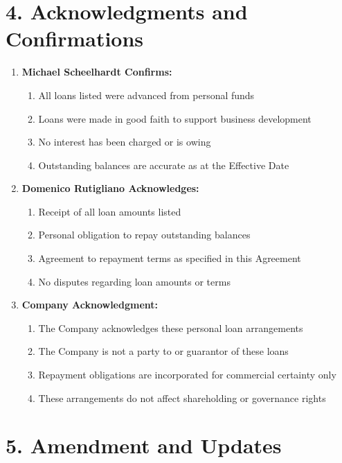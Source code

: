\section*{4. Acknowledgments and Confirmations}

\begin{enumerate}[label=\arabic*.]
\item \textbf{Michael Scheelhardt Confirms:}
    \begin{enumerate}[label=(\alph*)]
    \item All loans listed were advanced from personal funds
    \item Loans were made in good faith to support business development
    \item No interest has been charged or is owing
    \item Outstanding balances are accurate as at the Effective Date
    \end{enumerate}

\item \textbf{Domenico Rutigliano Acknowledges:}
    \begin{enumerate}[label=(\alph*)]
    \item Receipt of all loan amounts listed
    \item Personal obligation to repay outstanding balances
    \item Agreement to repayment terms as specified in this Agreement
    \item No disputes regarding loan amounts or terms
    \end{enumerate}

\item \textbf{Company Acknowledgment:}
    \begin{enumerate}[label=(\alph*)]
    \item The Company acknowledges these personal loan arrangements
    \item The Company is not a party to or guarantor of these loans
    \item Repayment obligations are incorporated for commercial certainty only
    \item These arrangements do not affect shareholding or governance rights
    \end{enumerate}
\end{enumerate}

\section*{5. Amendment and Updates}

